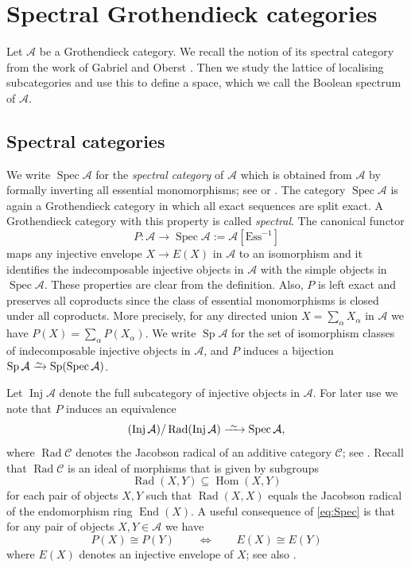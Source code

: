 \documentclass[a4paper]{amsart}
\theoremstyle{plain}
\theoremstyle{definition}
\theoremstyle{remark}
\numberwithin{equation}{section}
\newcommand{\End}{\operatorname{End}}
\newcommand{\Hom}{\operatorname{Hom}}
\newcommand{\Inj}{\operatorname{Inj}}
\newcommand{\Rad}{\operatorname{Rad}}
\newcommand{\Sp}{\operatorname{Sp}}
\newcommand{\Spec}{\operatorname{Spec}}
\newcommand{\Ess}{\mathrm{Ess}}
\newcommand{\iso}{\xrightarrow{\raisebox{-.4ex}[0ex][0ex]{$\scriptstyle{\sim}$}}}
\newcommand{\longiso}{\xrightarrow{\ \raisebox{-.4ex}[0ex][0ex]{$\scriptstyle{\sim}$}\ }}
\newcommand{\lto}{\longrightarrow}
\def\A{\mathcal A}
\def\C{\mathcal C}
\def\a{\alpha}
\begin{document}
\section{Spectral Grothendieck categories}\label{se:spec}

Let $\A$ be a Grothendieck category. We recall the notion of its
spectral category from the work of Gabriel and Oberst
\cite{GO1966}. Then we study the lattice of localising subcategories
and use this to define a space, which we call the Boolean spectrum of
$\A$.


\subsection*{Spectral categories}
We write $\Spec\A$ for the \emph{spectral category} of $\A$ which is
obtained from $\A$ by formally inverting all essential monomorphisms;
see \cite{GO1966} or \cite[V.7]{St1975}.  The category $\Spec\A$ is
again a Grothendieck category in which all exact sequences are split
exact. A Grothendieck category with this property is called
\emph{spectral}.  The canonical functor
\[P\colon\A\lto\Spec\A:=\A[\Ess^{-1}]\] maps any injective envelope
$X\to E(X)$ in $\A$ to an isomorphism and it identifies the
indecomposable injective objects in $\A$ with the simple objects in
$\Spec\A$. These properties are clear from the definition. Also, $P$
is left exact and preserves all coproducts since the class of
essential monomorphisms is closed under all coproducts.
More precisely, for any directed union $X=\sum_\a X_\a$ in $\A$ we have  $P(X)=\sum_\a P(X_\a)$.
We write
$\Sp\A$ for the set of isomorphism classes of indecomposable injective
objects in $\A$, and $P$ induces a bijection $\Sp\A\iso\Sp(\Spec\A)$.

Let $\Inj\A$ denote the full subcategory of injective objects in
$\A$. For later use we note that $P$ induces an equivalence
\begin{equation}\label{eq:Spec}
  (\Inj\A)/\Rad(\Inj\A)\longiso\Spec\A,
\end{equation}
where $\Rad\C$ denotes the Jacobson radical of an additive category
$\C$; see \cite[Proposition~2.5.9]{Kr2022}. Recall that $\Rad\C$ is
an ideal of morphisms that is given by subgroups
\[\Rad(X,Y)\subseteq\Hom(X,Y)\] for each pair of objects $X,Y$ such that
$\Rad(X,X)$ equals the Jacobson radical of the endomorphism ring
$\End(X)$. A useful consequence of \eqref{eq:Spec} is that for any
pair of objects $X,Y\in\A$ we have
\begin{equation}\label{eq:Spec-iso}
 P(X)\cong P(Y)\qquad\iff\qquad  E(X)\cong E(Y)
\end{equation}
where $E(X)$ denotes an injective envelope of $X$; see also
\cite[Satz~1.5]{GO1966}.
\end{document}
